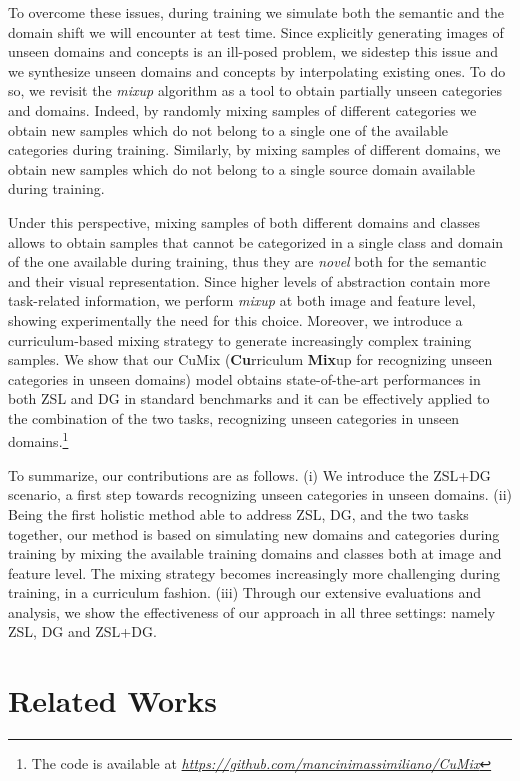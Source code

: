 \documentclass[runningheads]{llncs}
\newcommand{\methodName}{{CuMix} }
\newcommand{\methodNameFull}{\textbf{Cu}rriculum \textbf{Mix}up for recognizing unseen categories in unseen domains}
\begin{document}
{To overcome these issues, during training we 
simulate
both the semantic and the domain shift we will encounter at test time. Since explicitly generating images of unseen domains and concepts is an ill-posed problem, we sidestep this issue and we synthesize unseen domains and concepts by interpolating existing ones. To do so, we revisit the \textit{mixup} \cite{zhang2017mixup} algorithm as a tool to obtain partially unseen categories and domains. Indeed, by randomly mixing samples of different categories we obtain new samples which do not belong to a single one of the available categories during training. Similarly, by mixing samples of different domains, we obtain new samples which do not belong to a single source domain available during training.

Under this perspective, mixing samples of both different domains and classes allows to obtain samples that cannot be categorized in a single class and domain of the one available during training, thus they are \textit{novel} both for the semantic and their visual representation. Since higher levels of abstraction contain more task-related information, we perform \textit{mixup} at both image and feature level, showing experimentally the need for this choice. {Moreover, we introduce  a  curriculum-based  mixing  strategy to generate increasingly complex training samples. } 
We show that our \methodName (\methodNameFull) model obtains state-of-the-art performances in both ZSL and DG in standard benchmarks and it can be effectively applied to the combination of the two tasks, recognizing unseen categories in unseen domains.\footnote{The code is available at \textit{\url{https://github.com/mancinimassimiliano/CuMix}}}} 

To summarize, our contributions are as follows.
(i) We introduce the ZSL+DG scenario, a first step towards recognizing unseen categories in unseen domains.
(ii) Being the first holistic method able to address ZSL, DG, and the two tasks together, our method is based on simulating new domains and categories during training by mixing the available training domains and classes both at image and feature level. The mixing strategy becomes increasingly more challenging during training, in a curriculum fashion.
(iii) Through our extensive evaluations and analysis, we show the effectiveness of our approach in all three settings: namely ZSL, DG and ZSL+DG. 
\section{Related Works}
\end{document}
